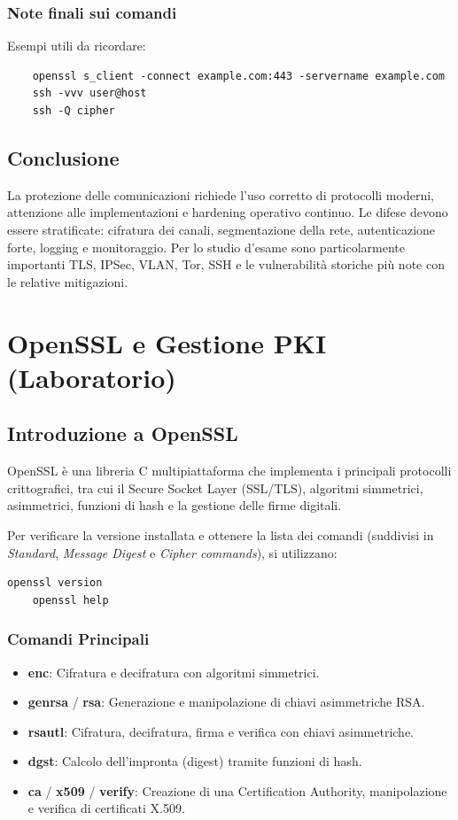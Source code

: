 \documentclass[12pt, a4paper]{report}
\begin{document}
\subsection{Note finali sui comandi}
Esempi utili da ricordare:
\begin{verbatim}
	openssl s_client -connect example.com:443 -servername example.com
	ssh -vvv user@host
	ssh -Q cipher
\end{verbatim}

\section{Conclusione}
La protezione delle comunicazioni richiede l'uso corretto di protocolli moderni, attenzione alle implementazioni e hardening operativo continuo. Le difese devono essere stratificate: cifratura dei canali, segmentazione della rete, autenticazione forte, logging e monitoraggio. Per lo studio d'esame sono particolarmente importanti TLS, IPSec, VLAN, Tor, SSH e le vulnerabilit\`a storiche pi\`u note con le relative mitigazioni.

\chapter{OpenSSL e Gestione PKI (Laboratorio)}

\section{Introduzione a OpenSSL}
OpenSSL è una libreria C multipiattaforma che implementa i principali protocolli crittografici, tra cui il Secure Socket Layer (SSL/TLS), algoritmi simmetrici, asimmetrici, funzioni di hash e la gestione delle firme digitali. 

Per verificare la versione installata e ottenere la lista dei comandi (suddivisi in \textit{Standard}, \textit{Message Digest} e \textit{Cipher commands}), si utilizzano:
\begin{lstlisting}[language=bash]
	openssl version
	openssl help
\end{lstlisting}

\subsection{Comandi Principali}
\begin{itemize}
	\item \textbf{enc}: Cifratura e decifratura con algoritmi simmetrici.
	\item \textbf{genrsa} / \textbf{rsa}: Generazione e manipolazione di chiavi asimmetriche RSA.
	\item \textbf{rsautl}: Cifratura, decifratura, firma e verifica con chiavi asimmetriche.
	\item \textbf{dgst}: Calcolo dell'impronta (digest) tramite funzioni di hash.
	\item \textbf{ca} / \textbf{x509} / \textbf{verify}: Creazione di una Certification Authority, manipolazione e verifica di certificati X.509.
\end{itemize}
\end{document}

